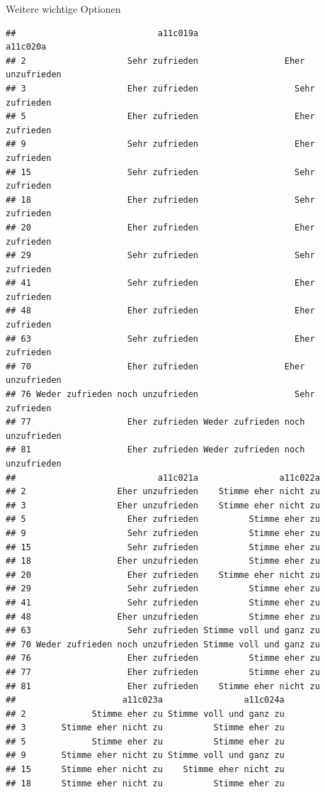 \documentclass[ignorenonframetext,]{beamer}
\begin{document}
\begin{frame}[fragile]{Weitere wichtige Optionen}
\begin{verbatim}
##                            a11c019a                         a11c020a
## 2                    Sehr zufrieden                 Eher unzufrieden
## 3                    Eher zufrieden                   Sehr zufrieden
## 5                    Eher zufrieden                   Eher zufrieden
## 9                    Sehr zufrieden                   Eher zufrieden
## 15                   Sehr zufrieden                   Sehr zufrieden
## 18                   Eher zufrieden                   Sehr zufrieden
## 20                   Eher zufrieden                   Eher zufrieden
## 29                   Sehr zufrieden                   Sehr zufrieden
## 41                   Sehr zufrieden                   Eher zufrieden
## 48                   Eher zufrieden                   Eher zufrieden
## 63                   Sehr zufrieden                   Eher zufrieden
## 70                   Eher zufrieden                 Eher unzufrieden
## 76 Weder zufrieden noch unzufrieden                   Sehr zufrieden
## 77                   Eher zufrieden Weder zufrieden noch unzufrieden
## 81                   Eher zufrieden Weder zufrieden noch unzufrieden
##                            a11c021a                a11c022a
## 2                  Eher unzufrieden    Stimme eher nicht zu
## 3                  Eher unzufrieden    Stimme eher nicht zu
## 5                    Eher zufrieden          Stimme eher zu
## 9                    Sehr zufrieden          Stimme eher zu
## 15                   Sehr zufrieden          Stimme eher zu
## 18                 Eher unzufrieden          Stimme eher zu
## 20                   Eher zufrieden    Stimme eher nicht zu
## 29                   Sehr zufrieden          Stimme eher zu
## 41                   Sehr zufrieden          Stimme eher zu
## 48                 Eher unzufrieden          Stimme eher zu
## 63                   Sehr zufrieden Stimme voll und ganz zu
## 70 Weder zufrieden noch unzufrieden Stimme voll und ganz zu
## 76                   Eher zufrieden          Stimme eher zu
## 77                   Eher zufrieden          Stimme eher zu
## 81                   Eher zufrieden    Stimme eher nicht zu
##                     a11c023a                a11c024a
## 2             Stimme eher zu Stimme voll und ganz zu
## 3       Stimme eher nicht zu          Stimme eher zu
## 5             Stimme eher zu          Stimme eher zu
## 9       Stimme eher nicht zu Stimme voll und ganz zu
## 15      Stimme eher nicht zu    Stimme eher nicht zu
## 18      Stimme eher nicht zu          Stimme eher zu

\end{verbatim}
\end{frame}
\end{document}
